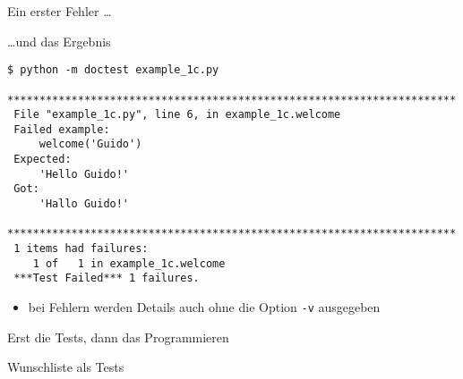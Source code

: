 \documentclass[t, utf8x, 10pt]{beamer}
\begin{document}
\begin{frame}{Ein erster Fehler \dots}
 
\end{frame}


\begin{frame}[fragile]{\dots und das Ergebnis}
 \begin{lstlisting}[language={}]
 $ python -m doctest example_1c.py
 **********************************************************************
 File "example_1c.py", line 6, in example_1c.welcome
 Failed example:
     welcome('Guido')
 Expected:
     'Hello Guido!'
 Got:
     'Hallo Guido!'
 **********************************************************************
 1 items had failures:
    1 of   1 in example_1c.welcome
 ***Test Failed*** 1 failures.
 \end{lstlisting}

 \begin{itemize}
  \item bei Fehlern werden Details auch ohne die Option \texttt{-v} ausgegeben
 \end{itemize}
\end{frame}


\begin{frame}[c]{Erst die Tests, dann das Programmieren}
 \begin{center}
  \begin{Large}
   \setlength{}	  
  \end{Large}
 \end{center}
\end{frame}


\begin{frame}{Wunschliste als Tests}
 
\end{frame}
\end{document}
